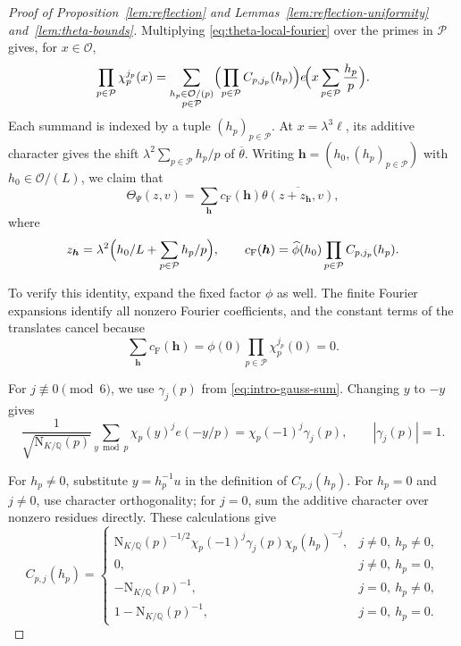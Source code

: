 \documentclass[11pt,a4paper]{article}
\numberwithin{equation}{section}
\numberwithin{figure}{section}
\theoremstyle{definition}
\theoremstyle{remark}
\newcommand{\Q}{\mathbb Q}
\newcommand{\NK}{\mathrm N_{K/\Q}}
\newcommand{\OO}{\mathcal O}
\begin{document}
\begin{proof}[Proof of Proposition~\ref{lem:reflection} and Lemmas~\ref{lem:reflection-uniformity} and~\ref{lem:theta-bounds}]
Multiplying \eqref{eq:theta-local-fourier} over the primes in
$\mathcal P$ gives, for $x\in\OO$,
\[
 \prod_{p\in\mathcal P}\chi_p^{j_p}(x)
 =\sum_{\substack{h_p\in\OO/(p)\\p\in\mathcal P}}
  \Bigl(\prod_{p\in\mathcal P}C_{p,j_p}(h_p)\Bigr)
  e\!\Bigl(x\sum_{p\in\mathcal P}\frac{h_p}{p}\Bigr).
\]
Each summand is indexed by a tuple $(h_p)_{p\in\mathcal P}$.
At $x=\lambda^3\ell$, its additive character gives the shift
$\lambda^2\sum_{p\in\mathcal P}h_p/p$ of $\overline\theta$.
Writing $\boldsymbol h=(h_0,(h_p)_{p\in\mathcal P})$ with
$h_0\in\OO/(L)$, we claim that
\[
\Theta_\Psi(z,v)=\sum_{\boldsymbol h} c_{\mathrm F}(\boldsymbol h)\overline{\theta(z+z_{\boldsymbol h},v)},
\]
where
\begin{equation}\label{eq:theta-factorized-shifts}
 z_{\boldsymbol h}=\lambda^2\Bigl(h_0/L+\sum_{p\in\mathcal P}h_p/p\Bigr),
 \qquad c_{\mathrm F}(\boldsymbol h)=\widehat\phi(h_0)\prod_{p\in\mathcal P} C_{p,j_p}(h_p).
\end{equation}

To verify this identity, expand the fixed factor $\phi$ as well.
The finite Fourier expansions identify all nonzero Fourier
coefficients, and the constant terms of the translates cancel because
\[
 \sum_{\boldsymbol h} c_{\mathrm F}(\boldsymbol h)=\phi(0)\prod_{p\in\mathcal P}\chi_p^{j_p}(0)=0.
\]
\begin{samepage}
For $j\not\equiv0\pmod6$, we use $\gamma_j(p)$ from \eqref{eq:intro-gauss-sum}. Changing $y$ to $-y$ gives
\[
 \frac1{\sqrt{\NK(p)}}\sum_{y\bmod p}\chi_p(y)^j e(-y/p)
 =\chi_p(-1)^j\gamma_j(p),\qquad |\gamma_j(p)|=1.
\]
\end{samepage}

For $h_p\ne0$, substitute $y=h_p^{-1}u$ in the definition of
$C_{p,j}(h_p)$. For $h_p=0$ and $j\ne0$, use character orthogonality;
for $j=0$, sum the additive character over nonzero residues directly.
These calculations give
\begin{equation}\label{eq:ray-fourier}
C_{p,j}(h_p)=
 \begin{cases}
 \NK(p)^{-1/2}\chi_p(-1)^j\gamma_j(p)\chi_p(h_p)^{-j},
       &j\ne0,\ h_p\ne0,\\
 0,    &j\ne0,\ h_p=0,\\
 -\NK(p)^{-1},&j=0,\ h_p\ne0,\\
 1-\NK(p)^{-1},&j=0,\ h_p=0.
 \end{cases}
\end{equation}


\end{proof}
\end{document}
